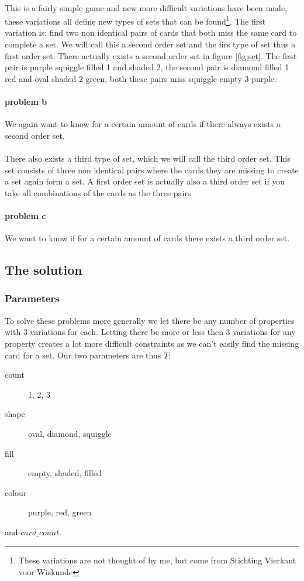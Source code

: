 \documentclass[12pt]{scrartcl}
\begin{document}
\paragraph{}
This is a fairly simple game and new more difficult variations have been made, these variations all define new types of sets that can be found\footnote{These variations are not thought of by me, but come from Stichting Vierkant voor Wiskunde}. The first variation is: find two non identical pairs of cards that both miss the same card to complete a set. We will call this a second order set and the firs type of set thus a first order set. There actually exists a second order set in figure \ref*{fig:set}. The first pair is purple squiggle filled 1 and shaded 2, the second pair is diamond filled 1 red and oval shaded 2 green, both these pairs miss squiggle empty 3 purple. 

\paragraph{problem b}
We again want to know for a certain amount of cards if there always exists a second order set.

\paragraph{}
There also exists a third type of set, which we will call the third order set. This set consists of three non identical pairs where the cards they are missing to create a set again form a set. A first order set is actually also a third order set if you take all combinations of the cards as the three pairs.

\paragraph{problem c}
We want to know if for a certain amount of cards there exists a third order set.

\subsection{The solution}
\subsubsection{Parameters}
To solve these problems more generally we let there be any number of properties with 3 variations for each. Letting there be more or less then 3 variations for any property creates a lot more difficult constraints as we can't easily find the missing card for a set. Our two parameters are thus $T$: 
\begin{description}
    \item[count] 1, 2, 3
    \item[shape] oval, diamond, squiggle
    \item[fill] empty, shaded, filled
    \item[colour] purple, red, green 
\end{description}
and $card\_count$.
\end{document}
